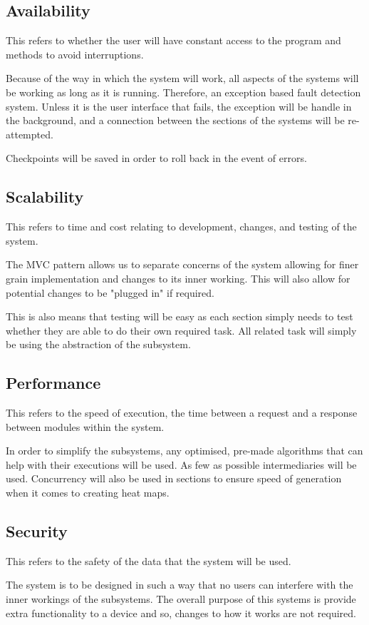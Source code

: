 \subsection{Availability}
This refers to whether the user will have constant access to the program and methods to avoid interruptions.

Because of the way in which the system will work, all aspects of the systems will be working as long as it is running. Therefore, an exception based fault detection system. Unless it is the user interface that fails, the exception will be handle in the background, and a connection between the sections of the systems will be re-attempted.

Checkpoints will be saved in order to roll back in the event of errors.

\subsection{Scalability}
This refers to time and cost relating to development, changes, and testing of the system.

The MVC pattern allows us to separate concerns of the system allowing for finer grain implementation and changes to its inner working. This will also allow for potential changes to be "plugged in" if required.

This is also means that testing will be easy as each section simply needs to test whether they are able to do their own required task. All related task will simply be using the abstraction of the subsystem.

\subsection{Performance}
This refers to the speed of execution, the time between a request and a response between modules within the system.

In order to simplify the subsystems, any optimised, pre-made algorithms that can help with their executions will be used. As few as possible intermediaries will be used. Concurrency will also be used in sections to ensure speed of generation when it comes to creating heat maps.

\subsection{Security}
This refers to the safety of the data that the system will be used.

The system is to be designed in such a way that no users can interfere with the inner workings of the subsystems. The overall purpose of this systems is provide extra functionality to a device and so, changes to how it works are not required.

